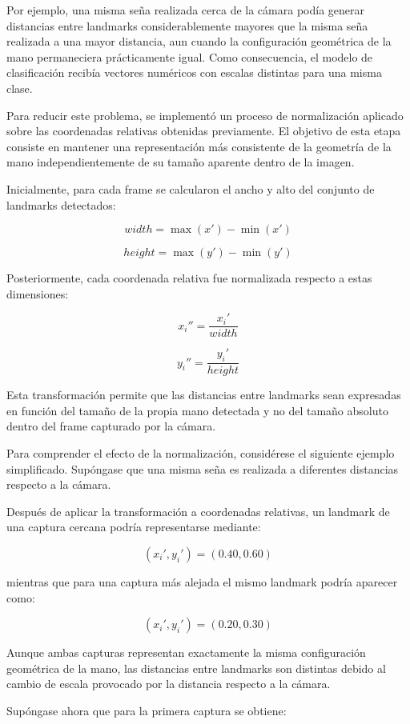 	Por ejemplo, una misma seña realizada cerca de la cámara podía generar distancias
	entre landmarks considerablemente mayores que la misma seña realizada a una mayor
	distancia, aun cuando la configuración geométrica de la mano permaneciera
	prácticamente igual. Como consecuencia, el modelo de clasificación recibía
	vectores numéricos con escalas distintas para una misma clase.
	
	Para reducir este problema, se implementó un proceso de normalización aplicado
	sobre las coordenadas relativas obtenidas previamente. El objetivo de esta etapa
	consiste en mantener una representación más consistente de la geometría de la
	mano independientemente de su tamaño aparente dentro de la imagen.
	
	Inicialmente, para cada frame se calcularon el ancho y alto del conjunto de
	landmarks detectados:
	
	\[
	width = \max(x') - \min(x')
	\]
	
	\[
	height = \max(y') - \min(y')
	\]
	
	Posteriormente, cada coordenada relativa fue normalizada respecto a estas
	dimensiones:
	
	\[
	x_i'' = \frac{x_i'}{width}
	\]
	
	\[
	y_i'' = \frac{y_i'}{height}
	\]
	
	Esta transformación permite que las distancias entre landmarks sean expresadas en
	función del tamaño de la propia mano detectada y no del tamaño absoluto dentro
	del frame capturado por la cámara.
	
	Para comprender el efecto de la normalización, considérese el siguiente ejemplo
	simplificado. Supóngase que una misma seña es realizada a diferentes distancias
	respecto a la cámara.
	
	Después de aplicar la transformación a coordenadas relativas, un landmark de una
	captura cercana podría representarse mediante:
	
	\[
	(x_i',y_i')=(0.40,0.60)
	\]
	
	mientras que para una captura más alejada el mismo landmark podría aparecer como:
	
	\[
	(x_i',y_i')=(0.20,0.30)
	\]
	
	Aunque ambas capturas representan exactamente la misma configuración geométrica
	de la mano, las distancias entre landmarks son distintas debido al cambio de
	escala provocado por la distancia respecto a la cámara.
	
	Supóngase ahora que para la primera captura se obtiene:
	
